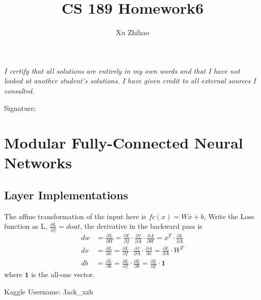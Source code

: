 \documentclass[a4paper,12pt]{article}
\title{CS 189 Homework6}
\author{Xu Zhihao}
\begin{document}
\pagestyle{fancy}{}
\fancyhf{} 
\rhead{\thepage \  / \pageref{LastPage}}

\maketitle

\emph{I certify that all solutions are entirely in my own words and that I have not looked at another student’s solutions. I have given credit to all external sources I consulted.} 
\begin{flushright}
Signature: \quad \quad \quad \quad \quad \quad \quad \quad \quad \quad \quad
\end{flushright}
\vspace{100pt}

\tableofcontents

\clearpage
\section{Modular Fully-Connected Neural Networks}

\subsection{Layer Implementations}


The affine transformation of the input here is $fc(x) = Wx + b$, Write the Loss function as L,  $\frac{\partial L}{\partial f} = dout$, the derivative in the backward pass is 
\begin{align*}
dw &= \frac{\partial L}{\partial W} = \frac{\partial L}{\partial f} \cdot \frac{\partial f}{\partial A} \cdot  \frac{\partial A}{\partial W} = x^T \cdot  \frac{\partial L}{\partial A} \\
dx &= \frac{\partial L}{\partial x} =  \frac{\partial L}{\partial f} \cdot \frac{\partial f}{\partial A} \cdot  \frac{\partial A}{\partial x} = \frac{\partial L}{\partial A}  \cdot W^T \\
db &=  \frac{\partial L}{\partial b} =  \frac{\partial L}{\partial f} \cdot  \frac{\partial L}{\partial b} =  \frac{\partial L}{\partial f} \cdot \textbf{1}    
\end{align*}
where $\textbf{1}$ is the all-one vector. \\

\vspace{100pt}

Kaggle Username: Jack\_xzh \\
\end{document}
